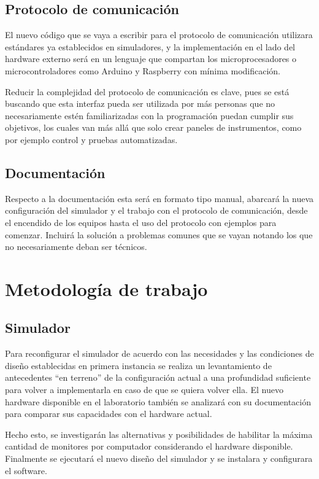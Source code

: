 \subsection{Protocolo de comunicación}

El nuevo código que se vaya a escribir para el protocolo de comunicación utilizara estándares ya establecidos en simuladores, y la implementación en el lado del hardware externo será en un lenguaje que compartan los microprocesadores o microcontroladores como Arduino y Raspberry con mínima modificación.

Reducir la complejidad del protocolo de comunicación es clave, pues se está buscando que esta interfaz pueda ser utilizada por más personas que no necesariamente estén familiarizadas con la programación puedan cumplir sus objetivos, los cuales van más allá que solo crear paneles de instrumentos, como por ejemplo control y pruebas automatizadas.

\subsection{Documentación}

Respecto a la documentación esta será en formato tipo manual, abarcará la nueva configuración del simulador y el trabajo con el protocolo de comunicación, desde el encendido de los equipos hasta el uso del protocolo con ejemplos para comenzar. Incluirá la solución a problemas comunes que se vayan notando los que no necesariamente deban ser técnicos.

\section{Metodología de trabajo}

\subsection{Simulador}

Para reconfigurar el simulador de acuerdo con las necesidades y las condiciones de diseño establecidas en primera instancia se realiza un levantamiento de antecedentes “en terreno” de la configuración actual a una profundidad suficiente para volver a implementarla en caso de que se quiera volver ella. El nuevo hardware disponible en el laboratorio también se analizará con su documentación para comparar sus capacidades con el hardware actual.

Hecho esto, se investigarán las alternativas y posibilidades de habilitar la máxima cantidad de monitores por computador considerando el hardware disponible. Finalmente se ejecutará el nuevo diseño del simulador y se instalara y configurara el software.

